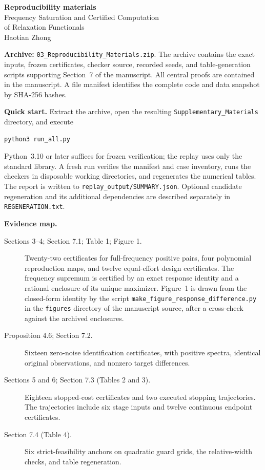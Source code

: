 \documentclass[11pt]{article}
\begin{document}
\begin{center}
{\Large\bfseries Reproducibility materials}\\[0.6em]
{\large Frequency Saturation and Certified Computation\\of Relaxation Functionals}\\[0.4em]
Haotian Zhong
\end{center}

\textbf{Archive:} \texttt{03\_Reproducibility\_Materials.zip}.
The archive contains the exact inputs, frozen certificates, checker source,
recorded seeds, and table-generation scripts supporting Section~7 of the
manuscript. All central proofs are contained in the manuscript. A file manifest
identifies the complete code and data snapshot by SHA-256 hashes.

\textbf{Quick start.} Extract the archive, open the resulting
\texttt{Supplementary\_Materials} directory, and execute
\begin{verbatim}
python3 run_all.py
\end{verbatim}
Python~3.10 or later suffices for frozen verification; the replay uses only the
standard library. A fresh run verifies the manifest and case inventory, runs the
checkers in disposable working directories, and regenerates the numerical tables.
The report is written to \texttt{replay\_output/SUMMARY.json}. Optional candidate
regeneration and its additional dependencies are described separately in
\texttt{REGENERATION.txt}.

\textbf{Evidence map.}
\begin{description}
\item[Sections 3--4; Section 7.1; Table 1; Figure 1.] Twenty-two certificates for
full-frequency positive pairs, four polynomial reproduction maps, and twelve
equal-effort design certificates. The frequency supremum is certified by an exact
response identity and a rational enclosure of its unique maximizer. Figure~1 is
drawn from the closed-form identity by the script
\texttt{make\_figure\_response\_difference.py} in the \texttt{figures} directory of
the manuscript source, after a cross-check against the archived enclosures.
\item[Proposition 4.6; Section 7.2.] Sixteen zero-noise identification
certificates, with positive spectra, identical original observations, and
nonzero target differences.
\item[Sections 5 and 6; Section 7.3 (Tables 2 and 3).] Eighteen stopped-cost
certificates and two executed stopping trajectories. The trajectories include six
stage inputs and twelve continuous endpoint certificates.
\item[Section 7.4 (Table 4).] Six strict-feasibility anchors on quadratic guard
grids, the relative-width checks, and table regeneration.
\end{description}
\end{document}
